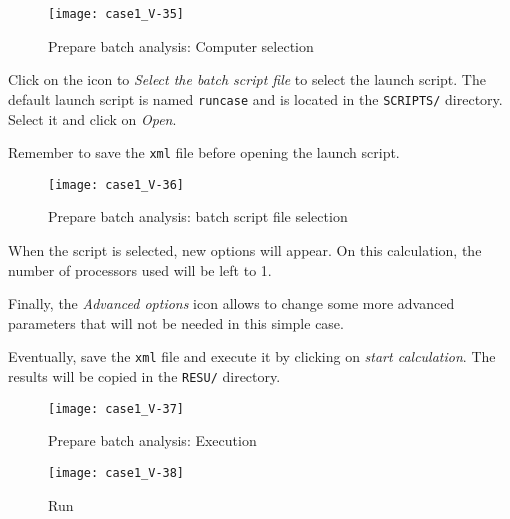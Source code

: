 \begin{figure}[ht]
\begin{center}
\texttt{[image: case1\_V-35]}
\caption{Prepare batch analysis: Computer selection}
\label{fig41_e1}
\end{center}
\end{figure}


\clearpage
Click on the icon to {\itshape Select the batch script file} to select the
launch script. The default launch script is named \texttt{runcase} and is
located in the \texttt{SCRIPTS/} directory. Select it and click on {\itshape Open}.

Remember to save the \texttt{xml} file before opening the launch script.

\begin{figure}[ht]
\begin{center}
\texttt{[image: case1\_V-36]}
\caption{Prepare batch analysis: batch script file selection}
\label{fig42_e1}
\end{center}
\end{figure}


\clearpage
When the script is selected, new options will appear.
On this calculation, the number of processors used will be left to 1.


Finally, the {\itshape Advanced options} icon allows to change some more
advanced parameters that will not be needed in this simple case.

Eventually, save the \texttt{xml} file and execute it by clicking on
 {\itshape start calculation}. The results will be copied in the \texttt{RESU/}
directory.

\begin{figure}[ht]
\begin{center}
\texttt{[image: case1\_V-37]}
\caption{Prepare batch analysis: Execution}
\label{fig43_e1}
\end{center}
\end{figure}


\begin{figure}[ht]
\begin{center}
\texttt{[image: case1\_V-38]}
\caption{Run}
\label{fig43_e1}
\end{center}
\end{figure}
